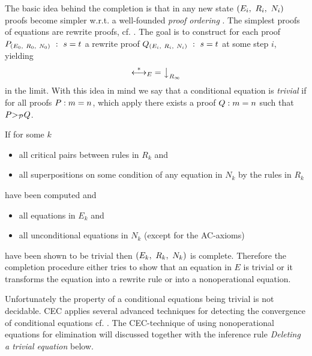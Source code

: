 The basic idea behind the completion is that in any new state
$\tripel{E_i}{R_i}{N_i}$ proofs become simpler w.r.t. 
a well-founded {\em proof ordering} \PO .
The simplest proofs of equations are rewrite proofs, cf. \cite{Gan87b}.
The goal
 is to construct for each proof 
$P_\tripel{E_0}{R_0}{N_0}\ :\ \eq{s}{t}$ a rewrite proof 
$Q_\tripel{E_i}{R_i}{N_i}\ :\ \eq{s}{t}$ at some step $i$,
yielding 
$$\rewSRT{E} = \nfrel{R_\infty}$$
in the limit.
With this idea in mind we say
that a conditional equation  is {\em trivial} if for all
proofs $P : \eq{m}{n}$, which apply  there exists a proof
$Q : \eq{m}{n}$ such that $P \PO Q$.

\noindent
If for some $k$ 
\begin{itemize}
\item all critical pairs between rules in $R_k$ and 
\item all superpositions on some condition of any  equation in $N_k$
by the rules in $R_k$ 
\end{itemize}
have been computed and 
\begin{itemize}
\item all equations in $E_k$ and 
\item all unconditional equations in $N_k$ (except for the AC-axioms)
\end{itemize}
have been shown to be trivial then $\tripel{E_k}{R_k}{N_k}$ is complete.
Therefore
the completion procedure either tries to show that an equation
in $E$ is trivial or it
transforms the equation into a rewrite rule
or into a nonoperational equation. 

Unfortunately the property of a conditional equations being trivial is not decidable.
CEC applies several advanced techniques for detecting the convergence of
conditional equations cf. \cite{Gan88a}. The CEC-technique of using nonoperational
equations for elimination will discussed together with
the inference rule {\em Deleting a trivial equation} below. \bigskip

\begin{CRule}
\end{CRule}

